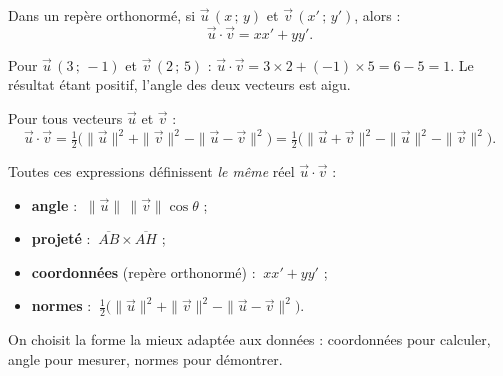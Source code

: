 \begin{illus}
\end{illus}

\begin{propriete}
Dans un repère orthonormé, si $\vec{u}\,(x\,;\,y)$ et $\vec{v}\,(x'\,;\,y')$, alors :
\[ \boxed{\;\vec{u}\cdot\vec{v}=xx'+yy'.\;} \]
\end{propriete}

\begin{exemple}
Pour $\vec{u}\,(3\,;\,-1)$ et $\vec{v}\,(2\,;\,5)$ :
$\vec{u}\cdot\vec{v}=3\times 2+(-1)\times 5=6-5=1.$ Le résultat étant positif, l'angle
des deux vecteurs est aigu.
\end{exemple}

\begin{propriete}
Pour tous vecteurs $\vec{u}$ et $\vec{v}$ :
\[ \vec{u}\cdot\vec{v}=\tfrac{1}{2}\big(\|\vec{u}\|^2+\|\vec{v}\|^2-\|\vec{u}-\vec{v}\|^2\big)
   =\tfrac{1}{2}\big(\|\vec{u}+\vec{v}\|^2-\|\vec{u}\|^2-\|\vec{v}\|^2\big). \]
\end{propriete}

\begin{aretenir}
Toutes ces expressions définissent \emph{le même} réel $\vec{u}\cdot\vec{v}$ :
\begin{itemize}
  \item \textbf{angle} : $\ \|\vec{u}\|\,\|\vec{v}\|\cos\theta$ ;
  \item \textbf{projeté} : $\ \overline{AB}\times\overline{AH}$ ;
  \item \textbf{coordonnées} (repère orthonormé) : $\ xx'+yy'$ ;
  \item \textbf{normes} : $\ \tfrac12\big(\|\vec{u}\|^2+\|\vec{v}\|^2-\|\vec{u}-\vec{v}\|^2\big)$.
\end{itemize}
On choisit la forme la mieux adaptée aux données : coordonnées pour calculer,
angle pour mesurer, normes pour démontrer.
\end{aretenir}


